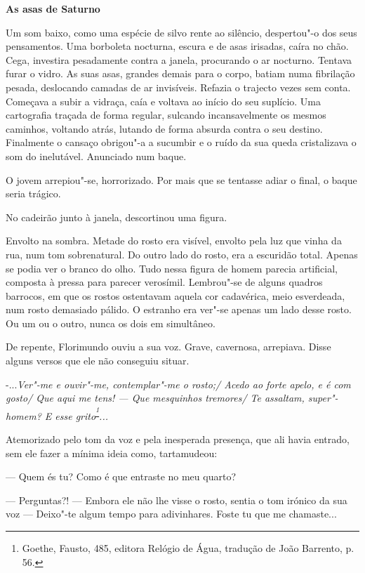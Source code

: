\vspace*{1.8cm}
\noindent{}\textbf{As asas de Saturno}

\bigskip

Um som baixo, como uma espécie de silvo rente ao silêncio, despertou"-o
dos seus pensamentos. Uma borboleta nocturna, escura e de asas irisadas,
caíra no chão. Cega, investira pesadamente contra a janela, procurando o
ar nocturno. Tentava furar o vidro. As suas asas, grandes demais para o
corpo, batiam numa fibrilação pesada, deslocando camadas de ar
invisíveis. Refazia o trajecto vezes sem conta. Começava a subir a
vidraça, caía e voltava ao início do seu suplício. Uma cartografia
traçada de forma regular, sulcando incansavelmente os mesmos caminhos,
voltando atrás, lutando de forma absurda contra o seu destino.
Finalmente o cansaço obrigou"-a a sucumbir e o ruído da sua queda
cristalizava o som do inelutável. Anunciado num baque.

O jovem arrepiou"-se, horrorizado. Por mais que se tentasse adiar o
final, o baque seria trágico.

No cadeirão junto à janela, descortinou uma figura.

Envolto na sombra. Metade do rosto era visível, envolto pela luz que
vinha da rua, num tom sobrenatural. Do outro lado do rosto, era a
escuridão total. Apenas se podia ver o branco do olho. Tudo nessa figura
de homem parecia artificial, composta à pressa para parecer verosímil.
Lembrou"-se de alguns quadros barrocos, em que os rostos ostentavam
aquela cor cadavérica, meio esverdeada, num rosto demasiado pálido. O
estranho era ver"-se apenas um lado desse rosto. Ou um ou o outro, nunca
os dois em simultâneo.

De repente, Florimundo ouviu a sua voz. Grave, cavernosa, arrepiava.
Disse alguns versos que ele não conseguiu situar.

-...\emph{Ver"-me e ouvir"-me, contemplar"-me o rosto;/ Acedo ao forte
apelo, e é com gosto/ Que aqui me tens! --- Que mesquinhos tremores/ Te
assaltam, super"-homem? E esse grito}\textsuperscript{\emph{\footnote{Goethe,
  Fausto, 485, editora Relógio de Água, tradução de João Barrento, p.
  56. }}}\emph{...}

Atemorizado pelo tom da voz e pela inesperada presença, que ali havia
entrado, sem ele fazer a mínima ideia como, tartamudeou:

--- Quem és tu? Como é que entraste no meu quarto?

--- Perguntas?! --- Embora ele não lhe visse o rosto, sentia o tom irónico
da sua voz --- Deixo"-te algum tempo para adivinhares. Foste tu que me
chamaste...

